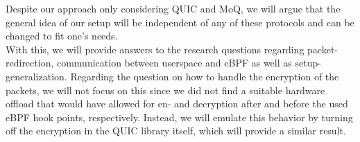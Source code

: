Despite our approach only considering QUIC and MoQ, we will argue that the general idea of our setup will be independent of
any of these protocols and can be changed to fit one's needs.
\\
With this, we will provide answers to the research questions regarding packet-redirection, communication between userspace and eBPF
as well as setup-generalization.
Regarding the question on how to handle the encryption of the packets, we will not focus on this since we did not find a suitable
hardware offload that would have allowed for en- and decryption after and before the used eBPF hook points, respectively.
Instead, we will emulate this behavior by turning off the encryption in the QUIC library itself, which will provide a similar result.

